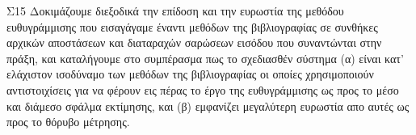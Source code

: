 \begin{bw_box}
\begin{customcontribution}{Σ15}
  \label{contribution:15}
  Δοκιμάζουμε διεξοδικά την επίδοση και την ευρωστία της μεθόδου ευθυγράμμισης
  που εισαγάγαμε έναντι μεθόδων της βιβλιογραφίας σε συνθήκες αρχικών
  αποστάσεων και διαταραχών σαρώσεων εισόδου που συναντώνται στην πράξη, και
  καταλήγουμε στο συμπέρασμα πως το σχεδιασθέν σύστημα (α) είναι κατ' ελάχιστον
  ισοδύναμο των μεθόδων της βιβλιογραφίας οι οποίες χρησιμοποιούν
  αντιστοιχίσεις για να φέρουν εις πέρας το έργο της ευθυγράμμισης ως προς το
  μέσο και διάμεσο σφάλμα εκτίμησης, και (β) εμφανίζει μεγαλύτερη ευρωστία απο
  αυτές ως προς το θόρυβο μέτρησης.
\end{customcontribution}
\end{bw_box}
